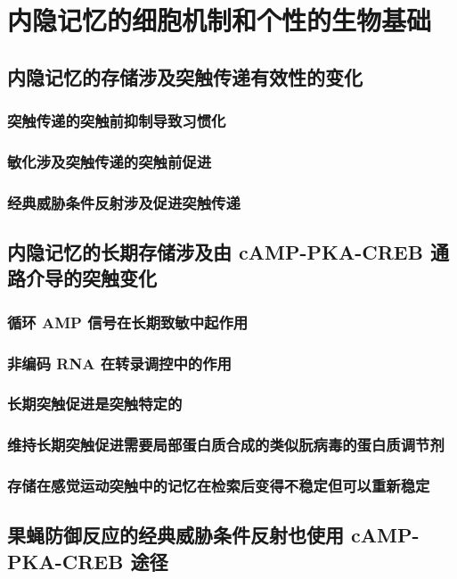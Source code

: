 \chapter{内隐记忆的细胞机制和个性的生物基础}


\section{内隐记忆的存储涉及突触传递有效性的变化}
\subsection{突触传递的突触前抑制导致习惯化}
\subsection{敏化涉及突触传递的突触前促进}
\subsection{经典威胁条件反射涉及促进突触传递}

\section{内隐记忆的长期存储涉及由 cAMP-PKA-CREB 通路介导的突触变化}
\subsection{循环 AMP 信号在长期致敏中起作用}
\subsection{非编码 RNA 在转录调控中的作用}
\subsection{长期突触促进是突触特定的}
\subsection{维持长期突触促进需要局部蛋白质合成的类似朊病毒的蛋白质调节剂}
\subsection{存储在感觉运动突触中的记忆在检索后变得不稳定但可以重新稳定}

\section{果蝇防御反应的经典威胁条件反射也使用 cAMP-PKA-CREB 途径}

